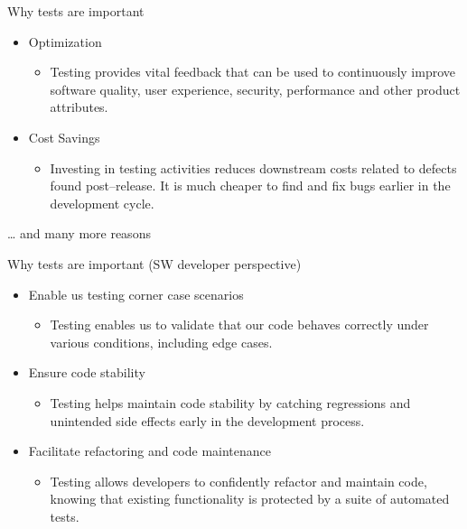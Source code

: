 \documentclass[
  ignorenonframetext,
  american,
  t,
  aspectratio=169]{beamer}
\providecommand{\tightlist}{%
  \setlength{\itemsep}{0pt}\setlength{\parskip}{0pt}}
\begin{document}
\begin{frame}{Why tests are important}
\protect{}\label{why-tests-are-important-1}
\begin{itemize}
\tightlist
\item
  Optimization

  \begin{itemize}
  \tightlist
  \item
    Testing provides vital feedback that can be used to continuously
    improve software quality, user experience, security, performance and
    other product attributes.
  \end{itemize}
\item
  Cost Savings

  \begin{itemize}
  \tightlist
  \item
    Investing in testing activities reduces downstream costs related to
    defects found post–release. It is much cheaper to find and fix bugs
    earlier in the development cycle.
  \end{itemize}
\end{itemize}

… and many more reasons
\end{frame}

\begin{frame}{Why tests are important (SW developer perspective)}
\protect{}\label{why-tests-are-important-sw-developer-perspective}
\begin{itemize}
\tightlist
\item
  Enable us testing corner case scenarios

  \begin{itemize}
  \tightlist
  \item
    Testing enables us to validate that our code behaves correctly under
    various conditions, including edge cases.
  \end{itemize}
\item
  Ensure code stability

  \begin{itemize}
  \tightlist
  \item
    Testing helps maintain code stability by catching regressions and
    unintended side effects early in the development process.
  \end{itemize}
\item
  Facilitate refactoring and code maintenance

  \begin{itemize}
  \tightlist
  \item
    Testing allows developers to confidently refactor and maintain code,
    knowing that existing functionality is protected by a suite of
    automated tests.
  \end{itemize}
\end{itemize}
\end{frame}
\end{document}
